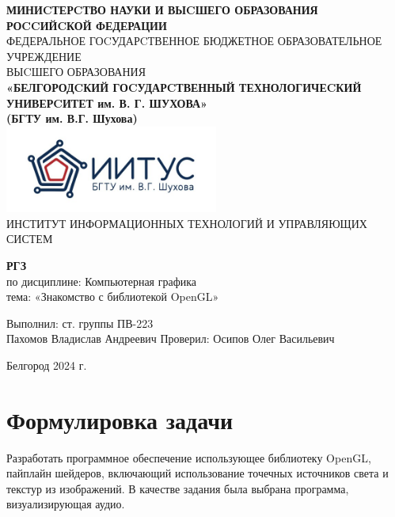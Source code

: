 \documentclass[a4paper,14pt]{extarticle}
\newcommand\textbox[1]{
	\parbox{.45\textwidth}{#1}
}
\begin{document}
\begin{center}
    \small{
        \textbf{МИНИCТЕРCТВО НАУКИ И ВЫCШЕГО ОБРАЗОВАНИЯ РОCCИЙCКОЙ ФЕДЕРАЦИИ}\\
        ФЕДЕРАЛЬНОЕ ГОCУДАРCТВЕННОЕ БЮДЖЕТНОЕ ОБРАЗОВАТЕЛЬНОЕ УЧРЕЖДЕНИЕ\\ВЫCШЕГО ОБРАЗОВАНИЯ \\
        \textbf{«БЕЛГОРОДCКИЙ ГОCУДАРCТВЕННЫЙ ТЕХНОЛОГИЧЕCКИЙ\\УНИВЕРCИТЕТ им. В. Г. ШУХОВА»\\ (БГТУ им. В.Г. Шухова)} \\
        \bigbreak
        \includegraphics[width=70mm]{log}\\
        ИНСТИТУТ ИНФОРМАЦИОННЫХ ТЕХНОЛОГИЙ И УПРАВЛЯЮЩИХ СИСТЕМ\\}
\end{center}

\vfill
\begin{center}
    \large{
        \textbf{
            РГЗ}}\\
    \normalsize{
        по дисциплине: Компьютерная графика \\
        тема: «Знакомство с библиотекой OpenGL»}
\end{center}
\vfill
\hfill\textbox{
    Выполнил: ст. группы ПВ-223\\Пахомов Владислав Андреевич
    \bigbreak
    Проверил: Осипов Олег Васильевич
}
\vfill\begin{center}
    Белгород 2024 г.
\end{center}
\newpage

\renewcommand{\contentsname}{Оглавление}
\tableofcontents\newpage

\section{Формулировка задачи}
Разработать программное обеспечение использующее библиотеку OpenGL, пайплайн шейдеров, 
включающий использование точечных источников света и текстур из изображений. \bigbreak
В качестве задания была выбрана программа, визуализирующая аудио.
\end{document}

